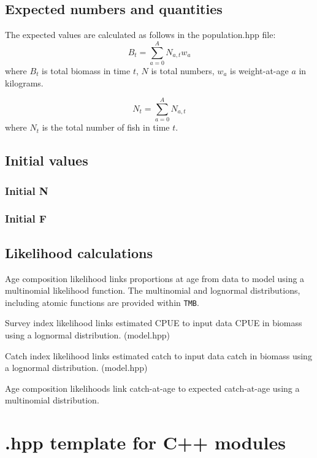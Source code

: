 \documentclass[
]{book}
\begin{document}
\hypertarget{expected-numbers-and-quantities}{%
\section{Expected numbers and quantities}\label{expected-numbers-and-quantities}}

The expected values are calculated as follows in the population.hpp file:
\[ B_t=\sum_{a=0}^AN_{a,t}w_a\]
where \(B_t\) is total biomass in time \(t\), \(N\) is total numbers, \(w_a\) is weight-at-age \(a\) in kilograms.

\[N_t=\sum_{a=0}^AN_{a,t}\]
where \(N_t\) is the total number of fish in time \(t\).

\hypertarget{initial-values}{%
\section{Initial values}\label{initial-values}}

\hypertarget{initial-n}{%
\subsection{Initial N}\label{initial-n}}

\hypertarget{initial-f}{%
\subsection{Initial F}\label{initial-f}}

\hypertarget{likelihood-calculations}{%
\section{Likelihood calculations}\label{likelihood-calculations}}

Age composition likelihood links proportions at age from data to model using a multinomial likelihood function. The multinomial and lognormal distributions, including atomic functions are provided within \texttt{TMB}.

Survey index likelihood links estimated CPUE to input data CPUE in biomass using a lognormal distribution. (model.hpp)

Catch index likelihood links estimated catch to input data catch in biomass using a lognormal distribution. (model.hpp)

Age composition likelihoods link catch-at-age to expected catch-at-age using a multinomial distribution.

\hypertarget{hpp-template-for-c-modules}{%
\chapter{.hpp template for C++ modules}\label{hpp-template-for-c-modules}}
\end{document}
